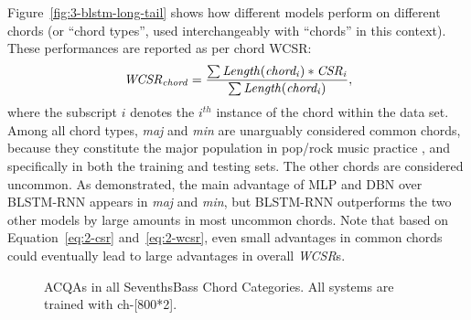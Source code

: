 Figure~\ref{fig:3-blstm-long-tail} shows how different models perform on different chords (or ``chord types'', used interchangeably with ``chords'' in this context). These performances are reported as per chord WCSR:
\begin{equation}
	\mathit{WCSR_{chord} = {\sum{Length(chord_i)*CSR_i} \over \sum{Length(chord_i)}}},
	\label{eq:3-wcsrchord}
\end{equation}
where the subscript $i$ denotes the $i^{th}$ instance of the chord within the data set. Among all chord types, \textit{maj} and \textit{min} are unarguably considered common chords, because they constitute the major population in pop/rock music practice \cite{burgoyne2011expert}, and specifically in both the training and testing sets. The other chords are considered uncommon. As demonstrated, the main advantage of MLP and DBN over BLSTM-RNN appears in \textit{maj} and \textit{min}, but BLSTM-RNN outperforms the two other models by large amounts in most uncommon chords. Note that based on Equation~\ref{eq:2-csr} and~\ref{eq:2-wcsr}, even small advantages in common chords could eventually lead to large advantages in overall \textit{WCSR}s.

\begin{figure}[htb]
	\centering
	\caption{ACQAs in all SeventhsBass Chord Categories. All systems are trained with ch-[800*2].}
	\label{fig:3-sumofsb}
\end{figure}

